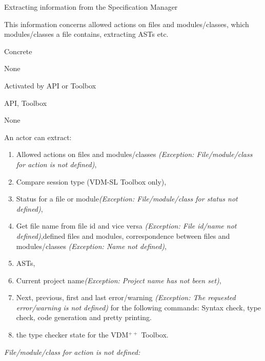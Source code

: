 \documentclass[11pt]{article}
\newcommand{\vdmpp}{{\small VDM}$^{++}$\/}
\newcommand{\vdmsl}{\small VDM-SL\/}
\newcommand{\specman} {Specification Manager}
\begin{document}
  \begin{description}
  {\large \item[Use Case no. 2:] Extracting information from the \specman{} }
\item[Introduction] \hfill\par This information concerns allowed
  actions on files and modules/classes, which modules/classes a file contains,
  extracting ASTs etc.
  \item[Type] Concrete 
  \item[Relations] None
  \item[Initialisation] \hfill\par Activated by API or Toolbox
  \item[Actors] \hfill\par API, Toolbox
  \item[Preconditions] \hfill\par None
  \item[Description] \hfill\par 
    An actor can extract:
    \begin{enumerate}
    \item Allowed actions on files and modules/classes \textit{(Exception:
        File/module/class for action is not defined)}, 
    \item Compare session type (\vdmsl{} Toolbox only),
    \item Status for a file or module\textit{(Exception: File/module/class
        for status not defined)},
    \item Get file name from file id and vice versa
      \textit{(Exception: File id/name not defined)},defined files and
      modules, correspondence between files and modules/classes
      \textit{(Exception: Name not defined)},
    \item ASTs,
    \item Current project name\textit{(Exception: Project name has not
        been set)},
    \item Next, previous, first and last error/warning
      \textit{(Exception: The requested error/warning is not defined)}
      for the following commands: Syntax check, type check, code
      generation and pretty printing.
    \item the type checker state for the \vdmpp{} Toolbox.
    \end{enumerate}
  \item[Exeptions] \hfill\par \textit{File/module/class for action is not defined:}

\end{description}
\end{document}
